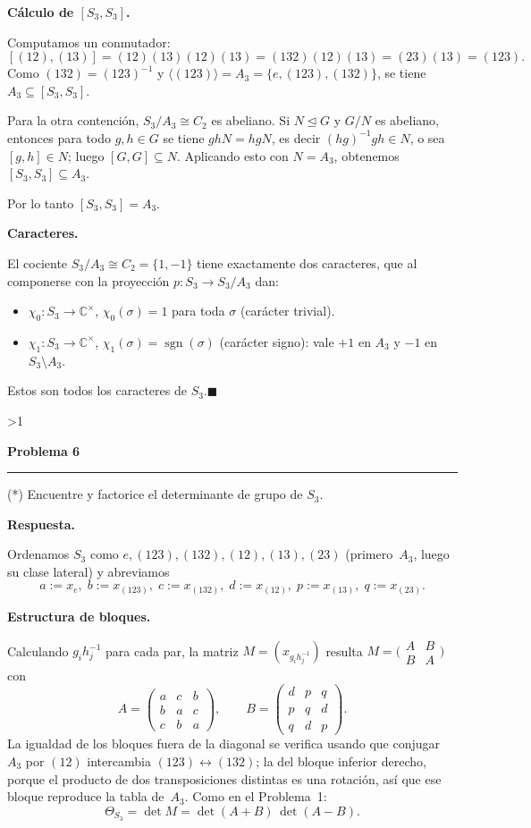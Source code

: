 \documentclass[10pt,a4paper]{article}
\newcommand{\CC}{\mathbb{C}}
\newcommand{\inlinehead}[2][repblue]{%
  \par\smallskip
  {\color{#1}\bfseries #2.}\hspace{0.45em}%
}
\newcommand{\blockhead}[2][repteal]{%
  \par\smallskip
  {\color{#1}\bfseries #2.}\par\nobreak\smallskip
}
\newcommand{\answer}{\inlinehead{Respuesta}}
\newcommand{\subhead}[1]{\blockhead{#1}}
\newcounter{probcnt}
\newcommand{\problem}[2]{%
  \stepcounter{probcnt}%
  \ifnum\value{probcnt}>1\newpage\fi
  \par\vspace{0.25em}
  {\large\bfseries\color{repblue} Problema #1}\par
  {\color{repline}\rule{\linewidth}{0.55pt}}\par
  \begin{tcolorbox}[
    breakable,
    colback=white,
    colframe=repline,
    borderline west={1.6pt}{0pt}{repteal},
    left=0.7em,
    right=0.7em,
    top=0.35em,
    bottom=0.3em,
    before skip=0.35em,
    after skip=0.45em
  ]
    #2
  \end{tcolorbox}
}
\begin{document}
\subhead{Cálculo de $[S_3,S_3]$}
Computamos un conmutador:
\[
  [(12),(13)]
  = (12)(13)(12)(13)
  = (132)(12)(13)
  = (23)(13)
  = (123).
\]
Como $(132)=(123)^{-1}$ y $\langle(123)\rangle = A_3 = \{e,(123),(132)\}$,
se tiene $A_3\subseteq [S_3,S_3]$.

Para la otra contención, $S_3/A_3\cong C_2$ es abeliano.
Si $N\trianglelefteq G$ y $G/N$ es abeliano, entonces para todo $g,h\in G$
se tiene $ghN=hgN$, es decir $(hg)^{-1}gh\in N$, o sea $[g,h]\in N$;
luego $[G,G]\subseteq N$.
Aplicando esto con $N=A_3$, obtenemos $[S_3,S_3]\subseteq A_3$.

Por lo tanto $[S_3,S_3]=A_3$.

\subhead{Caracteres}
El cociente $S_3/A_3\cong C_2=\{1,-1\}$ tiene exactamente dos caracteres, que
al componerse con la proyección $p\colon S_3\to S_3/A_3$ dan:
\begin{itemize}
  \item $\chi_0\colon S_3\to\CC^\times$,\; $\chi_0(\sigma)=1$ para toda
        $\sigma$ \textup{(carácter trivial)}.
  \item $\chi_1\colon S_3\to\CC^\times$,\; $\chi_1(\sigma)=\operatorname{sgn}(\sigma)$
        \textup{(carácter signo):} vale $+1$ en $A_3$ y $-1$ en $S_3\setminus A_3$.
\end{itemize}
Estos son todos los caracteres de $S_3$.\hfill$\blacksquare$

\problem{6}{%
(*) Encuentre y factorice el determinante de grupo de $S_3$.
}

\answer
\begingroup
\fontsize{8.8}{10.2}\selectfont
\setlength{\abovedisplayskip}{0.28em}
\setlength{\belowdisplayskip}{0.28em}
\setlength{\abovedisplayshortskip}{0.18em}
\setlength{\belowdisplayshortskip}{0.18em}
\setlength{\arraycolsep}{3.2pt}
\renewcommand{\arraystretch}{0.96}

Ordenamos $S_3$ como $e,(123),(132),(12),(13),(23)$ (primero~$A_3$, luego
su clase lateral) y abreviamos
\[
  a:=x_e,\; b:=x_{(123)},\; c:=x_{(132)},\;
  d:=x_{(12)},\; p:=x_{(13)},\; q:=x_{(23)}.
\]

\subhead{Estructura de bloques}
Calculando $g_ih_j^{-1}$ para cada par, la matriz
$M=(x_{g_ih_j^{-1}})$ resulta $M=\bigl(\begin{smallmatrix}A&B\\B&A\end{smallmatrix}\bigr)$ con
\[
  A=\begin{pmatrix}a&c&b\\b&a&c\\c&b&a\end{pmatrix},\qquad
  B=\begin{pmatrix}d&p&q\\p&q&d\\q&d&p\end{pmatrix}.
\]
La igualdad de los bloques fuera de la diagonal se verifica usando que
conjugar $A_3$ por $(12)$ intercambia $(123)\leftrightarrow(132)$;
la del bloque inferior derecho, porque el producto de dos transposiciones
distintas es una rotación, así que ese bloque reproduce la tabla de~$A_3$.
Como en el Problema~1:
\[
  \Theta_{S_3}=\det M=\det(A+B)\,\det(A-B).
\]
\end{document}

